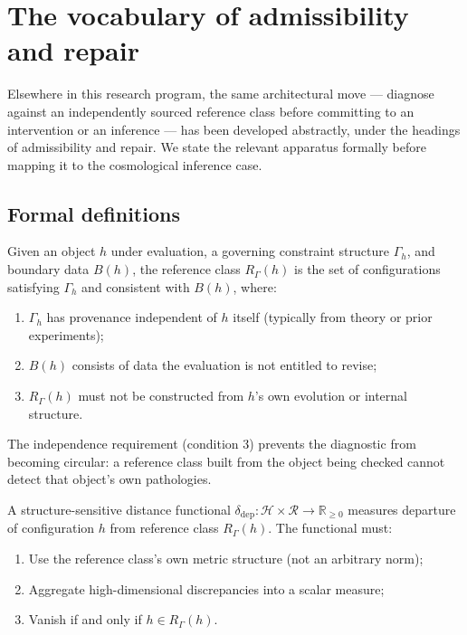 \documentclass[11pt]{article}
\newcommand{\RGam}{R_\Gamma}
\newcommand{\ddep}{\delta_{\mathrm{dep}}}
\begin{document}
\section{The vocabulary of admissibility and repair}

Elsewhere in this research program, the same architectural move --- diagnose against an independently sourced reference class before committing to an intervention or an inference --- has been developed abstractly, under the headings of admissibility and repair. We state the relevant apparatus formally before mapping it to the cosmological inference case.

\subsection{Formal definitions}

\begin{definition}
Given an object $h$ under evaluation, a governing constraint structure $\Gamma_h$, and boundary data $B(h)$, the reference class $\RGam(h)$ is the set of configurations satisfying $\Gamma_h$ and consistent with $B(h)$, where:
\begin{enumerate}
\item $\Gamma_h$ has provenance independent of $h$ itself (typically from theory or prior experiments);
\item $B(h)$ consists of data the evaluation is not entitled to revise;
\item $\RGam(h)$ must not be constructed from $h$'s own evolution or internal structure.
\end{enumerate}
\end{definition}

The independence requirement (condition 3) prevents the diagnostic from becoming circular: a reference class built from the object being checked cannot detect that object's own pathologies.

\begin{definition}
A structure-sensitive distance functional $\ddep: \mathcal{H} \times \mathcal{R} \to \mathbb{R}_{\geq 0}$ measures departure of configuration $h$ from reference class $\RGam(h)$. The functional must:
\begin{enumerate}
\item Use the reference class's own metric structure (not an arbitrary norm);
\item Aggregate high-dimensional discrepancies into a scalar measure;
\item Vanish if and only if $h \in \RGam(h)$.
\end{enumerate}
\end{definition}
\end{document}
